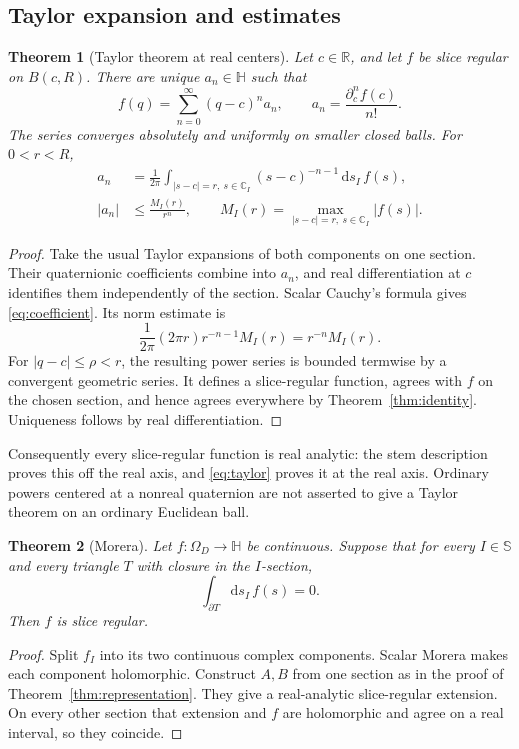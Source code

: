 \documentclass[11pt,a4paper]{article}
\numberwithin{equation}{section}
\newtheorem{theorem}{Theorem}[section]
\theoremstyle{definition}
\theoremstyle{remark}
\newcommand{\R}{\mathbb R}
\newcommand{\C}{\mathbb C}
\newcommand{\HH}{\mathbb H}
\newcommand{\SSS}{\mathbb S}
\newcommand{\pc}{\partial_c}
\begin{document}
\subsection{Taylor expansion and estimates}
\begin{theorem}[Taylor theorem at real centers]
\label{thm:taylor}
Let $c\in\R$, and let $f$ be slice regular on $B(c,R)$. There are unique
$a_n\in\HH$ such that
\begin{equation}
 f(q)=\sum_{n=0}^{\infty}(q-c)^n a_n,\qquad
 a_n=\frac{\pc^n f(c)}{n!}.
 \label{eq:taylor}
\end{equation}
The series converges absolutely and uniformly on smaller closed balls.
For $0<r<R$,
\begin{align}
 a_n&=\frac1{2\pi}\int_{|s-c|=r,\ s\in\C_I}
          (s-c)^{-n-1}\,\mathrm ds_I\,f(s),\label{eq:coefficient}\\
 |a_n|&\le \frac{M_I(r)}{r^n},\qquad
 M_I(r)=\max_{|s-c|=r,\ s\in\C_I}|f(s)|.\label{eq:cauchy-estimate}
\end{align}
\end{theorem}
\begin{proof}
Take the usual Taylor expansions of both components on one section. Their
quaternionic coefficients combine into $a_n$, and real differentiation at
$c$ identifies them independently of the section. Scalar Cauchy's formula
gives \eqref{eq:coefficient}. Its norm estimate is
\[
 \frac1{2\pi}(2\pi r)r^{-n-1}M_I(r)=r^{-n}M_I(r).
\]
For $|q-c|\le\rho<r$, the resulting power series is bounded termwise by a
convergent geometric series. It defines a slice-regular function, agrees with
$f$ on the chosen section, and hence agrees everywhere by
Theorem~\ref{thm:identity}. Uniqueness follows by real differentiation.
\end{proof}
Consequently every slice-regular function is real analytic: the stem description
proves this off the real axis, and \eqref{eq:taylor} proves it at the real axis.
Ordinary powers centered at a nonreal quaternion are not asserted to give a
Taylor theorem on an ordinary Euclidean ball.

\begin{theorem}[Morera]
\label{thm:morera-slice}
Let $f:\Omega_D\to\HH$ be continuous. Suppose that for every $I\in\SSS$ and
every triangle $T$ with closure in the $I$-section,
\[
 \int_{\partial T}\mathrm ds_I\,f(s)=0.
\]
Then $f$ is slice regular.
\end{theorem}
\begin{proof}
Split $f_I$ into its two continuous complex components. Scalar Morera makes
each component holomorphic. Construct $A,B$ from one section as in the proof
of Theorem~\ref{thm:representation}. They give a real-analytic slice-regular
extension. On every other section that extension and $f$ are holomorphic and
agree on a real interval, so they coincide.
\end{proof}
\end{document}
